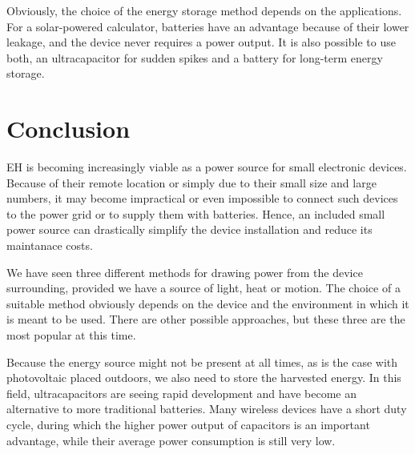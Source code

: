 \documentclass[a4paper,10pt]{article}
\begin{document}
Obviously, the choice of the energy storage method depends on the applications. For a solar-powered calculator, batteries have an advantage because of their lower leakage, and the device never requires a power output. It is also possible to use both, an ultracapacitor for sudden spikes and a battery for long-term energy storage. 

\section{Conclusion}

\acf{EH} is becoming increasingly viable as a power source for small electronic devices. Because of their remote location or simply due to their small size and large numbers, it may become impractical or even impossible to connect such devices to the power grid or to supply them with batteries. Hence, an included small power source can drastically simplify the device installation and reduce its maintanace costs. 

We have seen three different methods for drawing power from the device surrounding, provided we have a source of light, heat or motion. The choice of a suitable method obviously depends on the device and the environment in which it is meant to be used. There are other possible approaches, but these three are the most popular at this time. 

Because the energy source might not be present at all times, as is the case with photovoltaic placed outdoors, we also need to store the harvested energy. In this field, ultracapacitors are seeing rapid development and have become an alternative to more traditional batteries. Many wireless devices have a short duty cycle, during which the higher power output of capacitors is an important advantage, while their average power consumption is still very low. 


 
\end{document}
